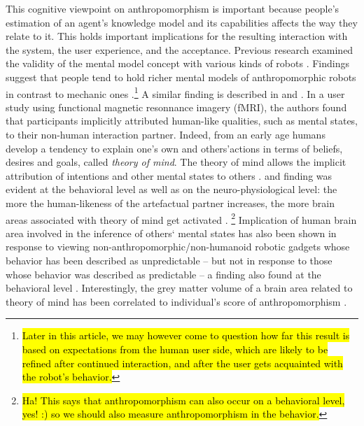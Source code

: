 \documentclass{frontiersSCNS} %
\begin{document}
This cognitive viewpoint on anthropomorphism is important because people's estimation of an agent's knowledge model and its capabilities affects the way they relate to it. This holds important implications for the resulting interaction with the system, the user experience, and the acceptance. Previous research examined the validity of the mental model concept with various kinds of robots \citep{schmitz_concepts_2011,kiesler_mental_2002}. Findings suggest that people tend to hold richer mental models of anthropomorphic robots in contrast to mechanic ones \citep{kiesler_mental_2002}.\footnote{\hl{Later in this article, we may however come to question how far this result is based on expectations from the human user side, which are likely to be refined after continued interaction, and after the user gets acquainted with the robot's behavior.}} 
A similar finding is described in \cite{hegel_understanding_2008} and
\citet{krach_can_2008}. In a user study using functional magnetic resonnance
imagery (fMRI), the authors found that participants
implicitly attributed human-like qualities, such as mental states, to their
non-human interaction partner. Indeed, from an early age humans develop a
tendency to explain one's own and others'actions in terms of beliefs, desires
and goals,  called \textit{theory of mind}. The theory of mind allows the implicit attribution of
intentions and other mental states to others \citep{premack1978does, leslie_pretense_1987, Frith2003}.
\citet{hegel_understanding_2008} and \citet{krach_can_2008} finding was evident at the behavioral level
as well as on the neuro-physiological level: the more the human-likeness of the
artefactual partner increases, the more brain areas associated with theory of
mind  get activated
\citep{krach_can_2008}. \footnote{\hl{Ha! This says that anthropomorphism can also occur on a behavioral level, yes! :) so we should also measure anthropomorphism in the behavior.}} 
Implication of human brain area involved in the inference of others` mental
states has also been shown in response to viewing
non-anthropomorphic/non-humanoid robotic gadgets whose behavior
has been described as unpredictable -- but not in response to those whose
behavior was described as predictable -- a finding also found at the behavioral
level \citep{Waytz2010}.
Interestingly, the grey matter volume of a brain area related to theory of mind
has been correlated to individual's score of anthropomorphism
\citep{cullen2013individual}.
\end{document}
